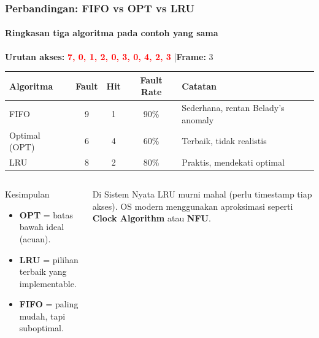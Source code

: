 \documentclass[t,aspectratio=169,xcolor=dvipsnames]{beamer}
\newcommand{\tem}[1]{\textbf{\textcolor{red}{#1}}}
\begin{document}
\begin{frame}
    \frametitle{Perbandingan: FIFO vs OPT vs LRU}
    \framesubtitle{Ringkasan tiga algoritma pada contoh yang sama}
    \footnotesize

    \textbf{Urutan akses:} \tem{7, 0, 1, 2, 0, 3, 0, 4, 2, 3} \quad|\quad \textbf{Frame:} 3

    \vspace{0.2cm}
    \begin{tabular}{|l|c|c|c|l|}
        \hline
        \textbf{Algoritma} & \textbf{Fault} & \textbf{Hit} & \textbf{Fault Rate} & \textbf{Catatan} \\
        \hline
        FIFO        & 9 & 1 & 90\% & Sederhana, rentan Belady's anomaly \\
        \hline
        Optimal (OPT) & 6 & 4 & 60\% & Terbaik, tidak realistis \\
        \hline
        LRU         & 8 & 2 & 80\% & Praktis, mendekati optimal \\
        \hline
    \end{tabular}

    \vspace{0.2cm}
    \begin{columns}[T]
        \begin{exampleblock}{Kesimpulan}
            \begin{itemize}
                \item \textbf{OPT} = batas bawah ideal (acuan).
                \item \textbf{LRU} = pilihan terbaik yang implementable.
                \item \textbf{FIFO} = paling mudah, tapi suboptimal.
            \end{itemize}
        \end{exampleblock}

        \begin{alertblock}{Di Sistem Nyata}
            LRU murni mahal (perlu timestamp tiap akses). OS modern menggunakan aproksimasi seperti \textbf{Clock Algorithm} atau \textbf{NFU}.
        \end{alertblock}
    \end{columns}
\end{frame}
\end{document}
